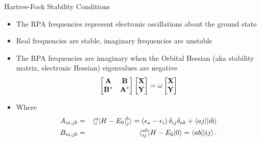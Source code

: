 \documentclass[10pt]{beamer}
\begin{document}
{{{{{{\begin{frame}{Hartree-Fock Stability Conditions}
	\begin{itemize}[<+->]
		\item{The RPA frequencies represent electronic oscillations about the ground state}
		\item{Real frequencies are stable, imaginary frequencies are unstable}
		\item{The RPA frequencies are imaginary when the \alert{Orbital Hessian} (aka stability matrix, electronic Hessian) eigenvalues are \alert{negative}
			\begin{eqnarray}
				\begin{bmatrix}
					\bf{A}   & \bf{B}   \\
					\bf{B}^* & \bf{A}^* \\
				\end{bmatrix}
				\begin{bmatrix}  \bf{X} \\ \bf{Y}  \end{bmatrix}
				= \omega \begin{bmatrix}  \bf{X} \\ \bf{Y}  \end{bmatrix}
			\end{eqnarray}
		}
		\item{Where}
		\begin{eqnarray}
			A_{ia,jb} &=& \braket{{}_i^a|H-E_0|{}_j^b} = \left(\epsilon_a - \epsilon_i \right) \delta_{ij}\delta_{ab} + \braket{aj||ib}
			\nonumber \\
			B_{ia,jb} &=& \braket{{}_{ij}^{ab}|H-E_0|0} = \braket{ab||ij}.
		\end{eqnarray}
	\end{itemize}
\end{frame}

}}}}}}
\end{document}
